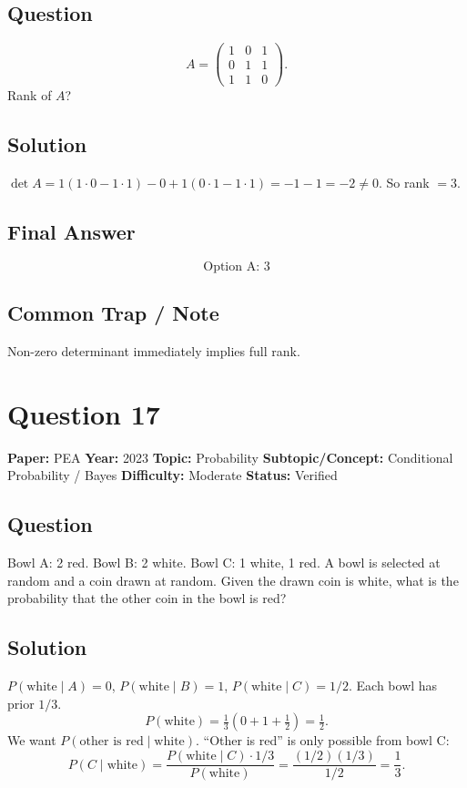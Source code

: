 \documentclass[11pt]{article}
\begin{document}
\subsection*{Question}
\[
A=\begin{pmatrix}1&0&1\\ 0&1&1\\ 1&1&0\end{pmatrix}.
\]
Rank of $A$?

\subsection*{Solution}
$\det A=1(1\cdot 0-1\cdot 1)-0+1(0\cdot 1-1\cdot 1)=-1-1=-2\ne 0$. So rank $=3$.

\subsection*{Final Answer}
\[
\boxed{\text{Option A: } 3}
\]

\subsection*{Common Trap / Note}
Non-zero determinant immediately implies full rank.

\medskip

\section*{Question 17}
\textbf{Paper:} PEA \quad \textbf{Year:} 2023 \quad \textbf{Topic:} Probability \quad \textbf{Subtopic/Concept:} Conditional Probability / Bayes \quad \textbf{Difficulty:} Moderate \quad \textbf{Status:} Verified

\subsection*{Question}
Bowl A: 2 red. Bowl B: 2 white. Bowl C: 1 white, 1 red. A bowl is selected at random and a coin drawn at random. Given the drawn coin is white, what is the probability that the other coin in the bowl is red?

\subsection*{Solution}
$P(\text{white}\mid A)=0$, $P(\text{white}\mid B)=1$, $P(\text{white}\mid C)=1/2$. Each bowl has prior $1/3$.
\[
P(\text{white})=\tfrac{1}{3}(0+1+\tfrac{1}{2})=\tfrac{1}{2}.
\]
We want $P(\text{other is red}\mid\text{white})$. ``Other is red'' is only possible from bowl C:
\[
P(C\mid\text{white})=\frac{P(\text{white}\mid C)\cdot 1/3}{P(\text{white})}=\frac{(1/2)(1/3)}{1/2}=\frac{1}{3}.
\]
\end{document}
